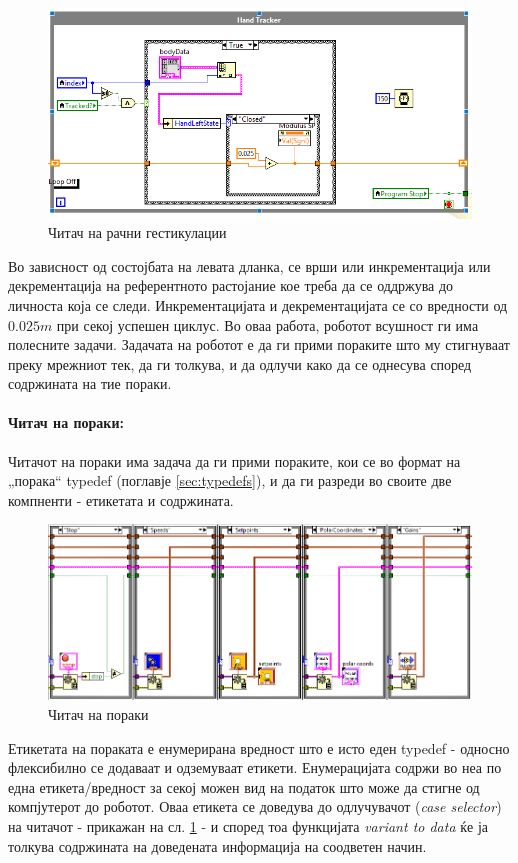 \documentclass[11pt]{article}
\begin{document}
      \begin{figure}[H]
        \centering
        \includegraphics[width=0.85\linewidth]{./images/hand_control.png}
        \caption{Читач на рачни гестикулации}
        \end{figure}

      Во зависност од состојбата на левата дланка, се врши или инкрементација или декрементација на референтното растојание кое треба да се оддржува до личноста која се следи. Инкрементацијата и декрементацијата се со вредности од $0.025m$ при секој успешен циклус.
    \bigbreak
    Во оваа работа, роботот всушност ги има полесните задачи. Задачата на роботот е да ги прими пораките што му стигнуваат преку мрежниот тек, да ги толкува, и да одлучи како да се однесува според содржината на тие пораки.

    \paragraph{Читач на пораки:\\}
      Читачот на пораки има задача да ги прими пораките, кои се во формат на „порака“ typedef (поглавје \ref{sec:typedefs}), и да ги разреди во своите две компненти - етикетата и содржината.
      \begin{figure}[H]
        \centering
        \includegraphics[width=0.85\linewidth]{./images/robot_msg.png}
        \caption{Читач на пораки}
        \label{fig:parser}
        \end{figure}
      Етикетата на пораката е енумерирана вредност што е исто еден typedef - односно флексибилно се додаваат и одземуваат етикети. Енумерацијата содржи во неа по една етикета/вредност за секој можен вид на податок што може да стигне од компјутерот до роботот. Оваа етикета се доведува до одлучувачот (\textit{case selector}) на читачот - прикажан на сл. \ref{fig:parser} - и според тоа функцијата \textit{variant to data} ќе ја толкува содржината на доведената информација на соодветен начин.
\end{document}
